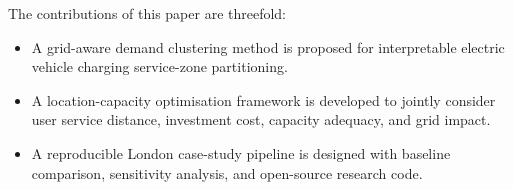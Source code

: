 The contributions of this paper are threefold:
\begin{itemize}
  \item A grid-aware demand clustering method is proposed for interpretable electric vehicle charging service-zone partitioning.
  \item A location-capacity optimisation framework is developed to jointly consider user service distance, investment cost, capacity adequacy, and grid impact.
  \item A reproducible London case-study pipeline is designed with baseline comparison, sensitivity analysis, and open-source research code.
\end{itemize}

